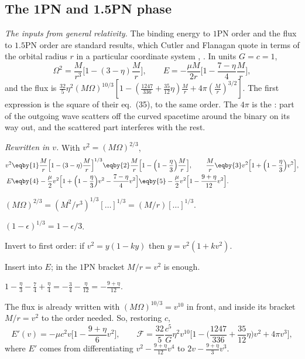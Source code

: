 \subsection{The 1PN and 1.5PN phase}

\emph{The inputs from general relativity.} The binding energy to $1$PN order and the flux to $1.5$PN order are standard results, which Cutler and Flanagan quote in terms of the orbital radius $r$ in a particular coordinate system \cite[eqs.~(35)--(37)]{CutlerFlanagan1994}, \cite{Blanchet2014}. In units $G=c=1$,
\begin{equation}
  \Omega^2=\frac{M}{r^3}\Big[1-(3-\eta)\frac Mr\Big],\qquad
  E=-\frac{\mu M}{2r}\Big[1-\frac{7-\eta}{4}\frac Mr\Big],
\end{equation}
and the flux is $\tfrac{32}{5}\eta^2(M\Omega)^{10/3}[1-(\tfrac{1247}{336}+\tfrac{35}{12}\eta)\tfrac Mr+4\pi(\tfrac Mr)^{3/2}]$. The first expression is the square of their eq.~(35), to the same order. The $4\pi$ is the : part of the outgoing wave scatters off the curved spacetime around the binary on its way out, and the scattered part interferes with the rest.

\emph{Rewritten in $v$.} With $v^2=(M\Omega)^{2/3}$,
\begin{align}
  v^2&\eqby{1}\frac Mr\Big[1-(3-\eta)\frac Mr\Big]^{1/3}\eqby{2}\frac Mr\Big[1-\Big(1-\frac\eta3\Big)\frac Mr\Big],
  \qquad \frac Mr\eqby{3}v^2\Big[1+\Big(1-\frac\eta3\Big)v^2\Big],\nonumber\\
  E&\eqby{4}-\frac{\mu}{2}v^2\Big[1+\Big(1-\frac\eta3\Big)v^2-\frac{7-\eta}{4}v^2\Big]
  \eqby{5}-\frac{\mu}{2}v^2\Big[1-\frac{9+\eta}{12}v^2\Big].
  \label{T2g:eq:E1PN}
\end{align}
\begin{explain}
  \item $(M\Omega)^{2/3}=(M^2/r^3)^{1/3}[\dots]^{1/3}=(M/r)[\dots]^{1/3}$.
  \item $(1-\epsilon)^{1/3}=1-\epsilon/3$.
  \item Invert to first order: if $v^2=y(1-ky)$ then $y=v^2(1+kv^2)$.
  \item Insert into $E$; in the $1$PN bracket $M/r=v^2$ is enough.
  \item $1-\tfrac\eta3-\tfrac74+\tfrac\eta4=-\tfrac34-\tfrac{\eta}{12}=-\tfrac{9+\eta}{12}$.
\end{explain}
The flux is already written with $(M\Omega)^{10/3}=v^{10}$ in front, and inside its bracket $M/r=v^2$ to the order needed. So, restoring $c$,
\begin{equation}
  E'(v)=-\mu c^2v\Big[1-\frac{9+\eta}{6}v^2\Big],\qquad
  \mathcal F=\frac{32}{5}\frac{c^5}{G}\eta^2v^{10}\Big[1-\Big(\frac{1247}{336}+\frac{35}{12}\eta\Big)v^2+4\pi v^3\Big],
\end{equation}
where $E'$ comes from differentiating $v^2-\tfrac{9+\eta}{12}v^4$ to $2v-\tfrac{9+\eta}{3}v^3$.

